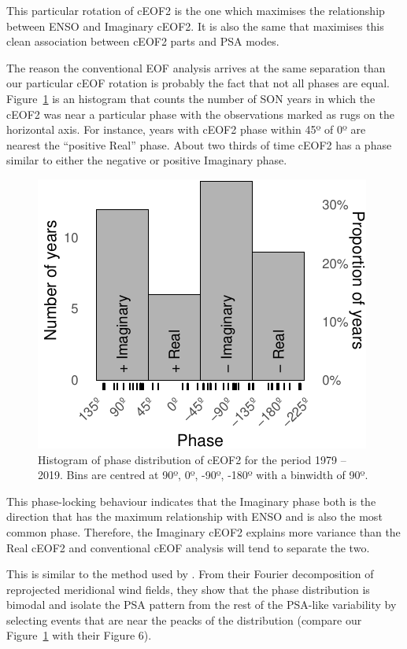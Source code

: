 \documentclass[smallextended]{svjour3}       %
\begin{document}
This particular rotation of cEOF2 is the one which maximises the relationship between ENSO and Imaginary cEOF2. It is also the same that maximises this clean association between cEOF2 parts and PSA modes.

The reason the conventional EOF analysis arrives at the same separation than our particular cEOF rotation is probably the fact that not all phases are equal. Figure~\ref{fig:phase-histogram} is an histogram that counts the number of SON years in which the cEOF2 was near a particular phase with the observations marked as rugs on the horizontal axis. For instance, years with cEOF2 phase within 45º of 0º are nearest the ``positive Real'' phase. About two thirds of time cEOF2 has a phase similar to either the negative or positive Imaginary phase.



\begin{figure}
\centering
\includegraphics{../figures/phase-histogram-1.pdf}
\caption{\label{fig:phase-histogram}Histogram of phase distribution of cEOF2 for the period 1979 -- 2019. Bins are centred at 90º, 0º, -90º, -180º with a binwidth of 90º.}
\end{figure}

This phase-locking behaviour indicates that the Imaginary phase both is the direction that has the maximum relationship with ENSO and is also the most common phase. Therefore, the Imaginary cEOF2 explains more variance than the Real cEOF2 and conventional cEOF analysis will tend to separate the two.

This is similar to the method used by \citet{irving2016}. From their Fourier decomposition of reprojected meridional wind fields, they show that the phase distribution is bimodal and isolate the PSA pattern from the rest of the PSA-like variability by selecting events that are near the peacks of the distribution (compare our Figure~\ref{fig:phase-histogram} with their Figure 6).
\end{document}
